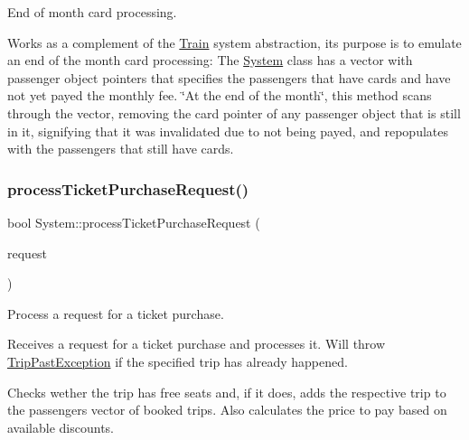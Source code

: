 End of month card processing. 

Works as a complement of the \mbox{\hyperlink{classTrain}{Train}} system abstraction, it\textquotesingle{}s purpose is to emulate an end of the month card processing\+: The \mbox{\hyperlink{classSystem}{System}} class has a vector with passenger object pointers that specifies the passengers that have cards and have not yet payed the monthly fee. \char`\"{}\+At the end of the month\char`\"{}, this method scans through the vector, removing the card pointer of any passenger object that is still in it, signifying that it was invalidated due to not being payed, and repopulates with the passengers that still have cards. \mbox{\label{classSystem_ac2b6f3d934b64f4fa56ffb1db1d261df}} 
\subsubsection{\texorpdfstring{process\+Ticket\+Purchase\+Request()}{processTicketPurchaseRequest()}}
{\footnotesize\ttfamily bool System\+::process\+Ticket\+Purchase\+Request (\begin{DoxyParamCaption}\item[{\mbox{\hyperlink{classTicketPurchaseRequest}{Ticket\+Purchase\+Request}} \&}]{request }\end{DoxyParamCaption})}



Process a request for a ticket purchase. 

Receives a request for a ticket purchase and processes it. Will throw \mbox{\hyperlink{classTripPastException}{Trip\+Past\+Exception}} if the specified trip has already happened.

Checks wether the trip has free seats and, if it does, adds the respective trip to the passenger\textquotesingle{}s vector of booked trips. Also calculates the price to pay based on available discounts.



